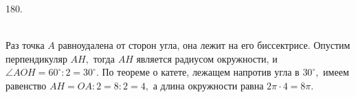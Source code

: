 180. \begin{figure}[ht!]
\end{figure}\\
Раз точка $A$ равноудалена от сторон угла, она лежит на его биссектрисе. Опустим перпендикуляр $AH,$ тогда $AH$ является радиусом окружности, и $\angle AOH=60^\circ:2=30^\circ.$ По теореме о катете, лежащем напротив угла в $30^\circ,$ имеем равенство $AH=OA:2=8:2=4,$ а длина окружности равна $2\pi\cdot4=8\pi.$\newpage\noindent
